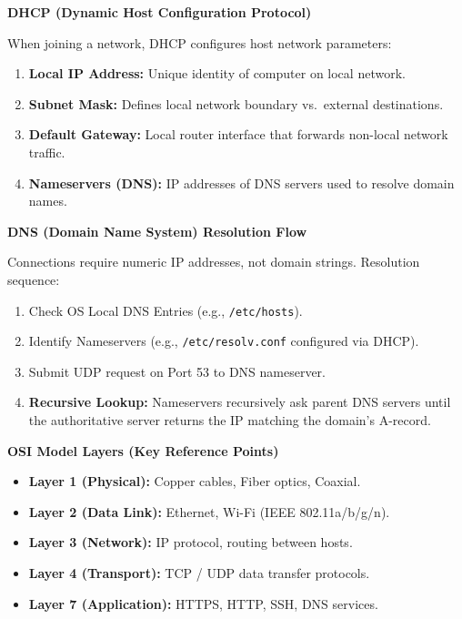 \documentclass[8pt, a4paper]{article}
\begin{document}
\begin{conceptbox}
\textbf{DHCP (Dynamic Host Configuration Protocol)}

When joining a network, DHCP configures host network parameters:
\begin{enumerate}
  \item \textbf{Local IP Address:} Unique identity of computer on local network.
  \item \textbf{Subnet Mask:} Defines local network boundary vs.\ external destinations.
  \item \textbf{Default Gateway:} Local router interface that forwards non-local network traffic.
  \item \textbf{Nameservers (DNS):} IP addresses of DNS servers used to resolve domain names.
\end{enumerate}
\end{conceptbox}

\begin{conceptbox}
\textbf{DNS (Domain Name System) Resolution Flow}

Connections require numeric IP addresses, not domain strings. Resolution sequence:
\begin{enumerate}
  \item Check OS Local DNS Entries (e.g., \texttt{/etc/hosts}).
  \item Identify Nameservers (e.g., \texttt{/etc/resolv.conf} configured via DHCP).
  \item Submit UDP request on Port 53 to DNS nameserver.
  \item \textbf{Recursive Lookup:} Nameservers recursively ask parent DNS servers until the authoritative server returns the IP matching the domain's A-record.
\end{enumerate}
\end{conceptbox}

\begin{conceptbox}
\textbf{OSI Model Layers (Key Reference Points)}
\begin{itemize}
  \item \textbf{Layer 1 (Physical):} Copper cables, Fiber optics, Coaxial.
  \item \textbf{Layer 2 (Data Link):} Ethernet, Wi-Fi (IEEE 802.11a/b/g/n).
  \item \textbf{Layer 3 (Network):} IP protocol, routing between hosts.
  \item \textbf{Layer 4 (Transport):} TCP / UDP data transfer protocols.
  \item \textbf{Layer 7 (Application):} HTTPS, HTTP, SSH, DNS services.
\end{itemize}
\end{conceptbox}
\end{document}
